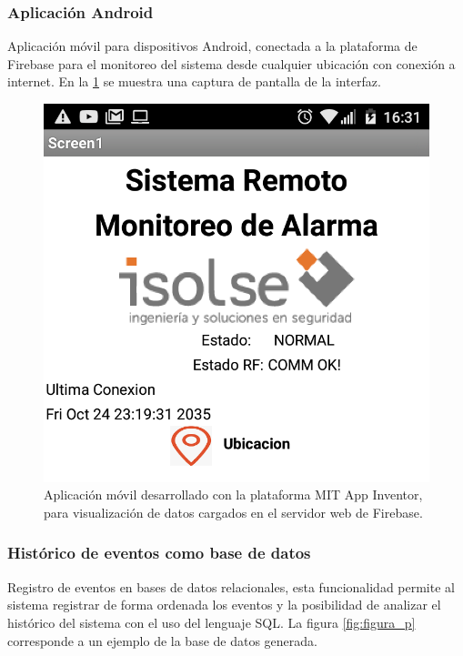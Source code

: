 \subsubsection{Aplicación Android}
Aplicación móvil para dispositivos Android, conectada a la plataforma de Firebase para el monitoreo del sistema desde cualquier ubicación con conexión a internet. En la \ref{fig:figura_n} se muestra una captura de pantalla de la interfaz.

\begin{figure}[ht]
	\centering
	\includegraphics[scale=.35]{./Figures/Capitulo4/Figura_N.png}
	\caption{Aplicación móvil desarrollado con la plataforma MIT App Inventor, para visualización de datos cargados en el servidor web de Firebase.}
	\label{fig:figura_n}
\end{figure}

\subsubsection{Histórico de eventos como base de datos}
Registro de eventos en bases de datos relacionales, esta funcionalidad permite al sistema registrar de forma ordenada los eventos y la posibilidad de analizar el histórico del sistema con el uso del lenguaje SQL. La figura \ref{fig:figura_p} corresponde a un ejemplo de la base de datos generada.

